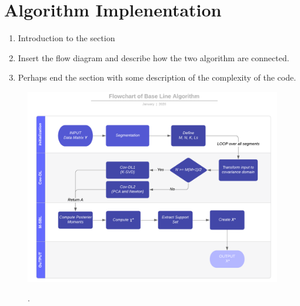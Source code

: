 \section{Algorithm Implenentation}

\begin{enumerate}
\item Introduction to the section
\item Insert the flow diagram and describe how the two algorithm are connected.
\item Perhaps end the section with some description of the complexity of the code.
\end{enumerate}

\begin{figure}[H]
\centering
\includegraphics[scale=0.5]{figures/chapter6/Flowchart.png}
\label{fig:flow}
\caption{.}
\end{figure}
\noindent
